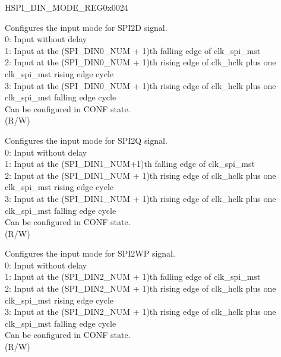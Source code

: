 \begin{register}{H}{SPI\_DIN\_MODE\_REG}{0x0024}\label{regdesc:SPIDINMODEREG}
%
%
%
%
%
%
%
%
%
%
\regnewline%
\begin{regdesc}\begin{reglist}
\label{fielddesc:SPIDIN0MODE}\item [SPI\_DIN0\_MODE] Configures the input mode for SPI2D signal.\\
0: Input without delay\\
1: Input at the (SPI\_DIN0\_NUM + 1)th falling edge of clk\_spi\_mst\\
2: Input at the (SPI\_DIN0\_NUM + 1)th rising edge of clk\_hclk plus one clk\_spi\_mst rising edge cycle\\
3: Input at the (SPI\_DIN0\_NUM + 1)th rising edge of clk\_hclk plus one clk\_spi\_mst falling edge cycle\\
Can be configured in CONF state. \\
(R/W)
\label{fielddesc:SPIDIN1MODE}\item [SPI\_DIN1\_MODE] Configures the input mode for SPI2Q signal.\\
0: Input without delay\\
1: Input at the (SPI\_DIN1\_NUM+1)th falling edge of clk\_spi\_mst\\
2: Input at the (SPI\_DIN1\_NUM + 1)th rising edge of clk\_hclk plus one clk\_spi\_mst rising edge cycle\\
3: Input at the (SPI\_DIN1\_NUM + 1)th rising edge of clk\_hclk plus one clk\_spi\_mst falling edge cycle\\
    Can be configured in CONF state. \\
    (R/W)
\label{fielddesc:SPIDIN2MODE}\item [SPI\_DIN2\_MODE] Configures the input mode for SPI2WP signal.\\
0: Input without delay\\
1: Input at the (SPI\_DIN2\_NUM + 1)th falling edge of clk\_spi\_mst\\
2: Input at the (SPI\_DIN2\_NUM + 1)th rising edge of clk\_hclk plus one clk\_spi\_mst rising edge cycle\\
3: Input at the (SPI\_DIN2\_NUM + 1)th rising edge of clk\_hclk plus one clk\_spi\_mst falling edge cycle\\
Can be configured in CONF state. \\
(R/W)
\item [Continued on the next page...]
\end{reglist}\end{regdesc}
\end{register}

